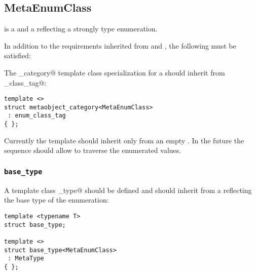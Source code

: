 \subsection{MetaEnumClass}
\label{concept-MetaEnumClass}

 is a  and a  reflecting a strongly type enumeration.

In addition to the requirements inherited from  and , the following must
be satisfied:

The \verb@metaobject_category@ template class specialization for a  should
inherit from \verb@enum_class_tag@:

\begin{verbatim}
template <>
struct metaobject_category<MetaEnumClass>
 : enum_class_tag
{ };
\end{verbatim}

Currently the \verb@members@ template should inherit only from an empty
. In the future the sequence should allow
to traverse the enumerated values.

\subsubsection{\texttt{base\_type}}

A template class \verb@base_type@ should be defined and should inherit from
a  reflecting the base type of the enumeration:

\begin{verbatim}
template <typename T>
struct base_type;

template <>
struct base_type<MetaEnumClass>
 : MetaType
{ };
\end{verbatim}
